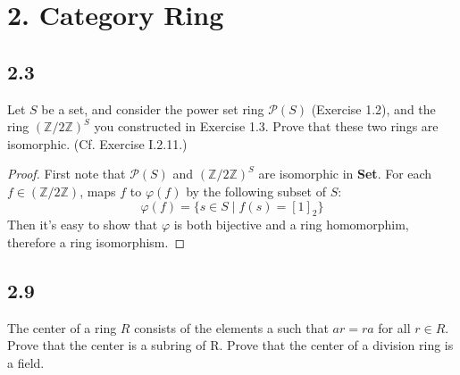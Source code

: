 \documentclass[a4paper, pdf, 12pt]{article}
\begin{document}
\section*{2. Category \textbf{Ring}}
\subsection*{2.3}
Let $S$ be a set, and consider the power set ring $\mathscr{P}(S)$ (Exercise 1.2), and the ring 
$(\mathbb{Z}/2\mathbb{Z})^{S}$ you constructed in Exercise 1.3. Prove that these two rings are isomorphic. 
(Cf. Exercise I.2.11.)
\begin{proof}
  First note that $\mathscr{P}(S)$ and $(\mathbb{Z}/2\mathbb{Z})^{S}$ are isomorphic in 
  \textbf{Set}. For each $f\in (\mathbb{Z}/2\mathbb{Z})$, maps $f$ to $\varphi(f)$ by the 
  following subset of $S$:
  $$
  \varphi(f) = \{s\in S\mid f(s) = [1]_{2}\}
  $$
  Then it's easy to show that $\varphi$ is both bijective and a ring homomorphim, therefore a ring isomorphism.
\end{proof}

\subsection*{2.9}
The center of a ring $R$ consists of the elements a such that $ar = ra$ for all $r \in R$. Prove that the center 
is a subring of R. Prove that the center of a division ring is a ﬁeld.
\end{document}
